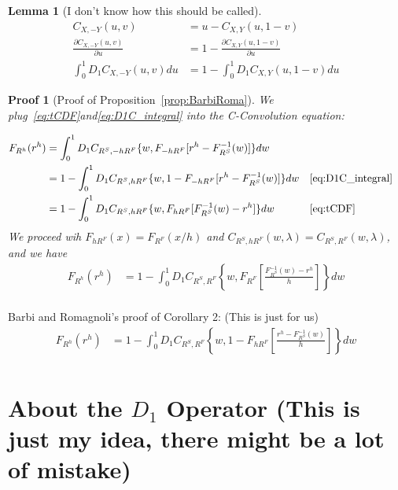 \documentclass[11pt, leqno]{article}
\newtheorem{lemma}{Lemma}[section]
\newtheorem{prf}{Proof}[section]
\numberwithin{equation}{section}
\begin{document}
\begin{lemma}[I don't know how this should be called]
    \begin{align}
        C_{X,-Y}(u,v) &= u - C_{X,Y}(u, 1-v)\nonumber\\
        \frac{\partial C_{X,-Y}(u,v)}{\partial u} &= 1 - \frac{\partial C_{X,Y}(u, 1-v)}{\partial u}\\
        \int^1_0 D_1 C_{X,-Y}(u,v)du &= 1 - \int^1_0 D_1 C_{X,Y}(u,1-v)du \label{eq:D1C_integral}
    \end{align}
\end{lemma}
\begin{prf}[Proof of Proposition~\ref{prop:BarbiRoma}]

    We plug~\eqref{eq:tCDF}and\eqref{eq:D1C_integral} into the C-Convolution equation:

    \begin{align*}
        F_{R^h}(r^h) &= \int^1_0 D_1 C_{R^S, -hR^F}
        \{w,
        F_{-hR^F}[r^h - F^{-1}_{R^S}(w)
        ]\}dw \\
        &= 1 - \int^1_0 D_1 C_{R^S, hR^F}
        \{w,
        1- F_{-hR^F}[r^h - F^{-1}_{R^S}(w)
        ]\}dw && \text{\eqref{eq:D1C_integral}}\\
        &= 1 - \int^1_0 D_1 C_{R^S, hR^F}
        \{w,
        F_{hR^F}[F^{-1}_{R^S}(w) - r^h
        ]\}dw && \text{\eqref{eq:tCDF}}
    \end{align*}
We proceed wih $F_{hR^F}(x)=F_{R^F}(x/h)$ and $C_{R^S,hR^F}(w, \lambda)=C_{R^S,R^F}(w, \lambda)$, and we have
    \begin{align*}
        F_{R^h}(r^h)
        &= 1- \int^1_0 D_1 C_{R^S, R^F}
        \left\{
        w,
        F_{R^F}
        \left[
        \frac{F^{-1}_{R^S}(w)-r^h}{h}
        \right]
        \right\}dw \\
    \end{align*}
\end{prf}

Barbi and Romagnoli's proof of Corollary 2: (This is just for us)
    \begin{align*}
        F_{R^h}(r^h)
        &= 1 - \int^1_0 D_1 C_{R^S, R^F}
        \left\{w,
        1- F_{hR^F}\left[\frac{r^h - F^{-1}_{R^S}(w)}{h}
        \right]\right\}dw \\
    \end{align*}

    \section{About the $D_1$ Operator (This is just my idea, there might be a lot of mistake)}\label{sec:D1}
\end{document}
